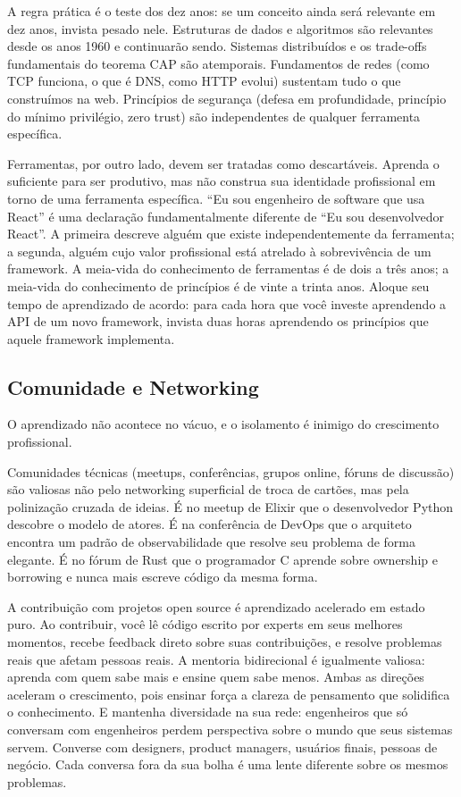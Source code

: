 A regra prática é o teste dos dez anos: se um conceito ainda será
relevante em dez anos, invista pesado nele. Estruturas de dados e
algoritmos são relevantes desde os anos 1960 e continuarão sendo.
Sistemas distribuídos e os trade-offs fundamentais do teorema CAP são
atemporais. Fundamentos de redes (como TCP funciona, o que é DNS,
como HTTP evolui) sustentam tudo o que construímos na web.
Princípios de segurança (defesa em profundidade, princípio do
mínimo privilégio, zero trust) são independentes de qualquer
ferramenta específica.

Ferramentas, por outro lado, devem ser tratadas como descartáveis.
Aprenda o suficiente para ser produtivo, mas não construa sua
identidade profissional em torno de uma ferramenta específica. ``Eu sou
engenheiro de software que usa React'' é uma declaração
fundamentalmente diferente de ``Eu sou desenvolvedor React''. A
primeira descreve alguém que existe independentemente da ferramenta; a
segunda, alguém cujo valor profissional está atrelado à sobrevivência
de um framework. A meia-vida do conhecimento de ferramentas é de dois
a três anos; a meia-vida do conhecimento de princípios é de vinte a
trinta anos. Aloque seu tempo de aprendizado de acordo: para cada hora
que você investe aprendendo a API de um novo framework, invista duas
horas aprendendo os princípios que aquele framework implementa.

\subsection{Comunidade e Networking}

O aprendizado não acontece no vácuo, e o isolamento é inimigo do crescimento profissional.

Comunidades técnicas (meetups, conferências, grupos online, fóruns de discussão) são valiosas não pelo networking superficial de troca de cartões, mas pela polinização cruzada de ideias. É no meetup de Elixir que o desenvolvedor Python descobre o modelo de atores. É na conferência de DevOps que o arquiteto encontra um padrão de observabilidade que resolve seu problema de forma elegante. É no fórum de Rust que o programador C aprende sobre ownership e borrowing e nunca mais escreve código da mesma forma.

A contribuição com projetos open source é aprendizado acelerado em estado puro. Ao contribuir, você lê código escrito por experts em seus melhores momentos, recebe feedback direto sobre suas contribuições, e resolve problemas reais que afetam pessoas reais. A mentoria bidirecional é igualmente valiosa: aprenda com quem sabe mais e ensine quem sabe menos. Ambas as direções aceleram o crescimento, pois ensinar força a clareza de pensamento que solidifica o conhecimento. E mantenha diversidade na sua rede: engenheiros que só conversam com engenheiros perdem perspectiva sobre o mundo que seus sistemas servem. Converse com designers, product managers, usuários finais, pessoas de negócio. Cada conversa fora da sua bolha é uma lente diferente sobre os mesmos problemas.

